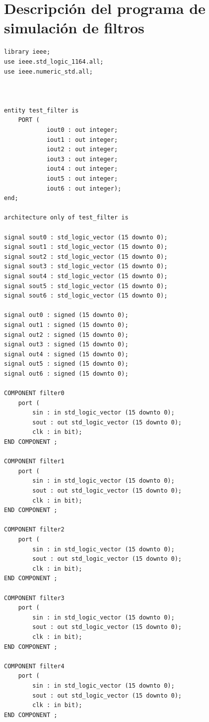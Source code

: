 \documentclass[a4paper,12pt]{report}
\begin{document}
\clearpage

\appendix
\appendixpage
\addappheadtotoc
\section{Descripción del programa de simulación de filtros}

\begin{framed}
\begin{lstlisting}[basicstyle=\footnotesize\ttfamily]
library ieee;
use ieee.std_logic_1164.all;
use ieee.numeric_std.all;

  

entity test_filter is
    PORT (
     		iout0 : out integer;
            iout1 : out integer;
            iout2 : out integer;
            iout3 : out integer;
            iout4 : out integer;
            iout5 : out integer;
            iout6 : out integer);
end;

architecture only of test_filter is

signal sout0 : std_logic_vector (15 downto 0);
signal sout1 : std_logic_vector (15 downto 0);
signal sout2 : std_logic_vector (15 downto 0);
signal sout3 : std_logic_vector (15 downto 0);
signal sout4 : std_logic_vector (15 downto 0);
signal sout5 : std_logic_vector (15 downto 0);
signal sout6 : std_logic_vector (15 downto 0);

signal out0 : signed (15 downto 0);
signal out1 : signed (15 downto 0);
signal out2 : signed (15 downto 0);
signal out3 : signed (15 downto 0);
signal out4 : signed (15 downto 0);
signal out5 : signed (15 downto 0);
signal out6 : signed (15 downto 0);

COMPONENT filter0
	port (
		sin : in std_logic_vector (15 downto 0);
		sout : out std_logic_vector (15 downto 0);
		clk : in bit);
END COMPONENT ;

COMPONENT filter1
	port (
		sin : in std_logic_vector (15 downto 0);
		sout : out std_logic_vector (15 downto 0);
		clk : in bit);
END COMPONENT ;

COMPONENT filter2
	port (
		sin : in std_logic_vector (15 downto 0);
		sout : out std_logic_vector (15 downto 0);
		clk : in bit);
END COMPONENT ;

COMPONENT filter3
	port (
		sin : in std_logic_vector (15 downto 0);
		sout : out std_logic_vector (15 downto 0);
		clk : in bit);
END COMPONENT ;

COMPONENT filter4
	port (
		sin : in std_logic_vector (15 downto 0);
		sout : out std_logic_vector (15 downto 0);
		clk : in bit);
END COMPONENT ;


\end{lstlisting}
\end{framed}
\end{document}
